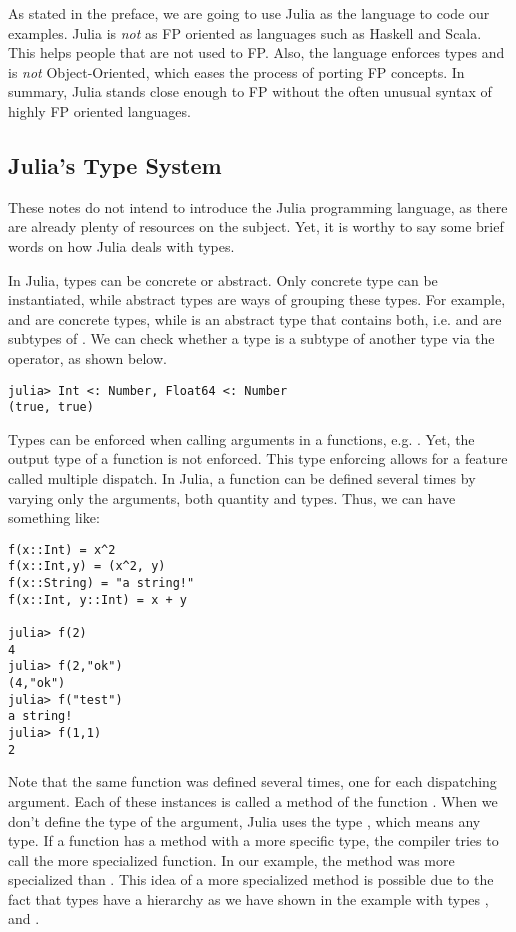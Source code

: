 As stated in the preface, we are going to use
Julia as the language to code our examples.
Julia is \textit{not} as FP oriented as languages such as Haskell and Scala.
This helps people that are not used to FP. Also,
the language enforces types and is \textit{not} Object-Oriented, which eases
the process of porting FP concepts. In summary, Julia stands close enough to FP
without the often unusual syntax of highly FP oriented languages.

\subsection{Julia's Type System}

These notes do not intend to introduce the Julia programming language, as there are
already plenty of resources on the subject. Yet, it is worthy to say some brief words on how
Julia deals with types.

In Julia, types can be concrete or abstract. Only concrete type can be instantiated, while abstract
types are ways of grouping these types. For example,  and  are concrete types, while
 is an abstract type that contains both, i.e.  and  are subtypes of .
We can check whether a type is a subtype of another type via the \pc{<:} operator, as shown below.
\bigskip
\begin{lstlisting}[language=JuliaLocal, style=julia, texcl=true]
julia> Int <: Number, Float64 <: Number
(true, true)
\end{lstlisting}

Types can be enforced when calling arguments in a functions, e.g.
. Yet, the output type of a function is not enforced.
This type enforcing allows for a feature called multiple dispatch. In Julia,
a function can be defined several times by varying only the arguments, both
quantity and types. Thus, we can have something like:

\begin{lstlisting}[language=JuliaLocal, style=julia, texcl=true]
f(x::Int) = x^2
f(x::Int,y) = (x^2, y)
f(x::String) = "a string!"
f(x::Int, y::Int) = x + y

julia> f(2)
4
julia> f(2,"ok")
(4,"ok")
julia> f("test")
a string!
julia> f(1,1)
2
\end{lstlisting}

Note that the same function  was defined several times, one for each
dispatching argument. Each of these instances is called a method of the function .
When we don't define the type of the argument,
Julia uses the type , which means any type.
If a function has a method with a more specific type, the compiler tries to
call the more specialized function. In our example, the method 
was more specialized than . This idea of a more specialized method
is possible due to the fact that types have a hierarchy as we have shown in the
example with types ,  and .

